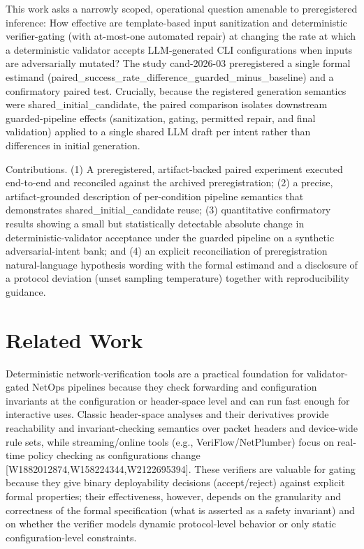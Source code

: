 \documentclass[conference]{IEEEtran}
\begin{document}
This work asks a narrowly scoped, operational question amenable to preregistered inference: How effective are template-based input sanitization and deterministic verifier-gating (with at-most-one automated repair) at changing the rate at which a deterministic validator accepts LLM-generated CLI configurations when inputs are adversarially mutated? The study cand-2026-03 preregistered a single formal estimand (paired\_success\_rate\_difference\_guarded\_minus\_baseline) and a confirmatory paired test. Crucially, because the registered generation semantics were shared\_initial\_candidate, the paired comparison isolates downstream guarded-pipeline effects (sanitization, gating, permitted repair, and final validation) applied to a single shared LLM draft per intent rather than differences in initial generation.

Contributions. (1) A preregistered, artifact-backed paired experiment executed end-to-end and reconciled against the archived preregistration; (2) a precise, artifact-grounded description of per-condition pipeline semantics that demonstrates shared\_initial\_candidate reuse; (3) quantitative confirmatory results showing a small but statistically detectable absolute change in deterministic-validator acceptance under the guarded pipeline on a synthetic adversarial-intent bank; and (4) an explicit reconciliation of preregistration natural-language hypothesis wording with the formal estimand and a disclosure of a protocol deviation (unset sampling temperature) together with reproducibility guidance.

\section{Related Work}
Deterministic network-verification tools are a practical foundation for validator-gated NetOps pipelines because they check forwarding and configuration invariants at the configuration or header-space level and can run fast enough for interactive uses. Classic header-space analyses and their derivatives provide reachability and invariant-checking semantics over packet headers and device-wide rule sets, while streaming/online tools (e.g., VeriFlow/NetPlumber) focus on real-time policy checking as configurations change [W1882012874,W158224344,W2122695394]. These verifiers are valuable for gating because they give binary deployability decisions (accept/reject) against explicit formal properties; their effectiveness, however, depends on the granularity and correctness of the formal specification (what is asserted as a safety invariant) and on whether the verifier models dynamic protocol-level behavior or only static configuration-level constraints.
\end{document}
